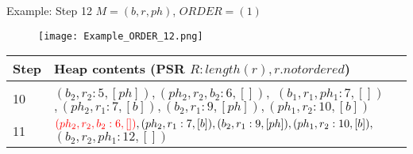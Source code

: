 \begin{frame}[noframenumbering]{Example: Step 12}
	$M = (b, r, ph)$, $ORDER = (1)$
	
	\begin{figure}[h]
		\texttt{[image: Example\_ORDER\_12.png]}
	\end{figure}
	
	\begin{table}[h]
		\centering
		\begin{tabular}{ |l|p{10cm}| } 
			\hline
			Step & Heap contents (PSR $R : length(r), r.notordered$) \\
			\hline
			10 & $(b_2, r_2 : 5, [ph]), (ph_2, r_2, b_2 : 6, []),$ \st{$(b_1, r_1, ph_1 : 7, [])$} $, (ph_2, r_1 :7, [b]), (b_2, r_1 : 9, [ph]), (ph_1, r_2 : 10, [b])$ \\ 
			\hline
			11 & $\textcolor{red}{(ph_2, r_2, b_2 : 6, [])}, (ph_2, r_1 :7, [b]), (b_2, r_1 : 9, [ph]), (ph_1, r_2 : 10, [b]),$ \st{$(b_2, r_2, ph_1 : 12, [])$} \\ 
			\hline
		\end{tabular}
	\end{table}

\end{frame}

